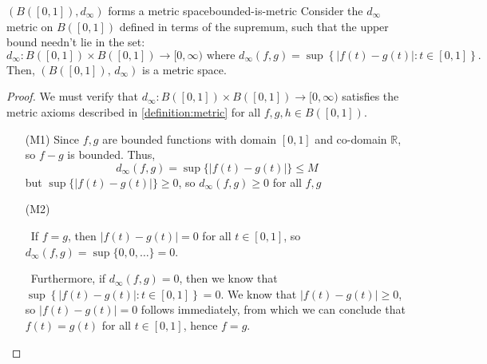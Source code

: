 \documentclass{article}
\newcommand*\iffforward{\par\boxed\Longrightarrow\ }
\newcommand*\iffbackward{\par\boxed\Longleftarrow\ }
\numberwithin{equation}{section}
\numberwithin{figure}{section}
\begin{document}
\begin{theorem}{\texorpdfstring{$(B([0, 1]),d_\infty)$}{The set of bounded functions over 0 and 1 inclusive with the sup-metric} forms a metric space}{bounded-is-metric}
    Consider the $ d_\infty $ metric on $ B([0, 1]) $ defined in terms of the
    supremum, such that the upper bound needn't lie in the set:
    \begin{equation}
        d_\infty \colon B([0, 1]) \times B([0, 1]) \to [0, \infty)
            \text{ where } d_\infty(f, g) = \sup\left\{\vert f(t) - g(t) \vert
            \colon t \in [0, 1] \right\}.
    \end{equation}
    Then, $ \left(B([0, 1]),\, d_\infty\right) $ is a metric space.
    \begin{proof}
        We must verify that $ d_\infty : B([0, 1]) \times B([0, 1]) \to [0,
        \infty) $ satisfies the metric axioms described in
        \cref{definition:metric} for all $ f, g, h \in B([0, 1]) $.
        \begin{itemize}
            \item[(M1)] Since $ f, g $ are bounded functions with domain $[0,1]$ and co-domain $\mathbb{R}$, so $f-g$ is bounded. Thus,
                \begin{equation}
                    d_\infty(f,g)=\sup\{\vert f(t)-g(t)\vert\} \leq M
                \end{equation}
            but $\sup\{\vert f(t)-g(t)\vert\} \geq 0$, so $d_\infty(f,g)\geq 0$ for all $f,g$
               
            \item[(M2)] \iffforward If $ f = g $, then $ \vert f(t) - g(t) \vert = 0 $
                for all $ t \in [0, 1] $, so $ d_\infty(f, g) = \sup\{0, 0,
                \ldots\} = 0 $.

                \iffbackward Furthermore, if $ d_\infty(f, g) = 0 $, then we
                know that $ \sup\left\{ \vert f(t) - g(t) \vert \colon t \in [0,
                1] \right\} = 0 $. We know that $ \vert f(t) - g(t) \vert \geq 0
                $, so $ \vert f(t) - g(t) \vert = 0 $ follows immediately, from
                which we can conclude that $ f(t) = g(t) $ for all $ t \in [0,
                1] $, hence $ f = g $.


\end{itemize}
\end{proof}
\end{theorem}
\end{document}

